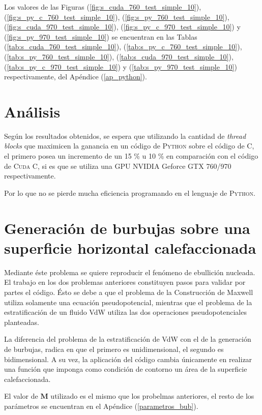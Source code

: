 Los valores de las Figuras (\ref{fig:s_cuda_760_test_simple_10}), (\ref{fig:s_py_c_760_test_simple_10}), (\ref{fig:s_py_760_test_simple_10}), (\ref{fig:s_cuda_970_test_simple_10}), (\ref{fig:s_py_c_970_test_simple_10}) y (\ref{fig:s_py_970_test_simple_10}) se encuentran en las Tablas (\ref{tab:s_cuda_760_test_simple_10}), (\ref{tab:s_py_c_760_test_simple_10}), (\ref{tab:s_py_760_test_simple_10}), (\ref{tab:s_cuda_970_test_simple_10}), (\ref{tab:s_py_c_970_test_simple_10}) y (\ref{tab:s_py_970_test_simple_10}) respectivamente, del Apéndice (\ref{ap_python}).
\section{Análisis}

Según los resultados obtenidos, se espera que utilizando la cantidad de \textit{thread blocks} que maximicen la ganancia en un código de \textsc{Python} sobre el código de \textsc{C}, el primero posea un incremento de un  15 \%  u 10 \% en comparación con el código de \textsc{Cuda C}, si es que se utiliza una GPU NVIDIA Geforce GTX 760/970 respectivamente.

Por lo que no se pierde mucha eficiencia programando en el lenguaje de \textsc{Python}.


\section{Generación de burbujas sobre una superficie horizontal calefaccionada}

Mediante éste problema se quiere reproducir el fenómeno de ebullición nucleada. El trabajo en los dos problemas anteriores constituyen pasos para validar por partes el código. Ésto se debe a que el problema de la Construcción de Maxwell utiliza solamente una ecuación pseudopotencial, mientras que el problema de la estratificación de un fluido VdW utiliza las dos operaciones pseudopotenciales planteadas.

La diferencia del problema de la estratificación de VdW con el de la generación de burbujas, radica en que el primero es unidimensional, el segundo es bidimensional. A su vez, la aplicación del código cambia únicamente en realizar una función que imponga como condición de contorno un área de la superficie calefaccionada.

El valor de $\mathbf{M}$ utilizado es el mismo que los probelmas anteriores, el resto de los parámetros se encuentran en el Apéndice (\ref{parametros_bub}).

